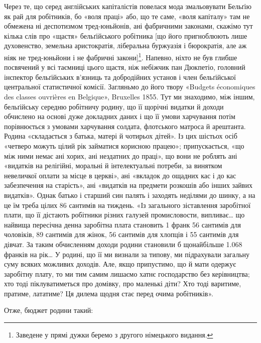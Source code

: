 
Через те, що серед англійських капіталістів повелася мода
змальовувати Бельґію як рай для робітників, бо «воля праці»
або, що те саме, «воля капіталу» там не обмежена ні деспотизмом
тред-юньйонів, ані фабричними законами, скажімо тут кілька
слів про «щастя» бельґійського робітника [що його пригноблюють
лише духовенство, земельна аристократія, ліберальна буржуазія
і бюрократія, але аж ніяк не тред-юньйони і не фабричні закони]\footnote*{
Заведене у прямі дужки беремо з другого німецького видання. 
}.
Напевно, ніхто не був глибше посвячений у всі таємниці
цього щастя, ніж небіжчик пан Дюкпетіо, головний інспектор
бельґійських в’язниць та добродійних установ і член бельґійської
центральної статистичної комісії. Загляньмо до його твору
«Budgets économiques des classes ouvrières en Belgique», Bruxelles
1855. Тут ми знаходимо, між іншим, бельґійську середню
робітничу родину, що її щорічні видатки й доходи обчислено
на основі дуже докладних даних і що її умови харчування потім
порівнюється з умовами харчування солдата, флотського матроса
й арештанта. Родина «складається з батька, матері й чотирьох
дітей». Із цих шістьох осіб «четверо можуть цілий рік займатися
корисною працею»; припускається, «що між ними немає ані
хорих, ані нездатних до праці», що вони не роблять ані «видатків
на релігійні, моральні й інтелектуальні потреби, за винятком
невеличкої оплати за місце в церкві», ані «вкладок до ощадних
кас і до кас забезпечення на старість», ані «видатків на предмети
розкошів або інших зайвих видатків». Однак батько і старший
син палять і заходять неділями до шинку, а на це їм треба цілих
86 сантимів на тиждень. «Із загального зіставлення заробітної
плати, що її дістають робітники різних галузей промисловости,
випливає\dots{} що найвища пересічна денна заробітна плата становить
1 франк 56 сантимів для чоловіків, 89 сантимів для жінок,
56 сантимів для хлопців і 55 сантимів для дівчат. За таким обчисленням
доходи родини становили б щонайбільше \num{1.068} франків
на рік\dots{} У родині, що її ми визнали за типову, ми підрахували
загальну суму всяких можливих доходів. Але, якщо припустимо,
що й мати одержує заробітну плату, то ми тим самим
лишаємо хатнє господарство без керівництва; хто тоді піклуватиметься
про домівку, про маленькі діти? Хто тоді варитиме, пратиме,
лататиме? Ця дилема щодня стає перед очима робітників».

Отже, бюджет родини такий:

